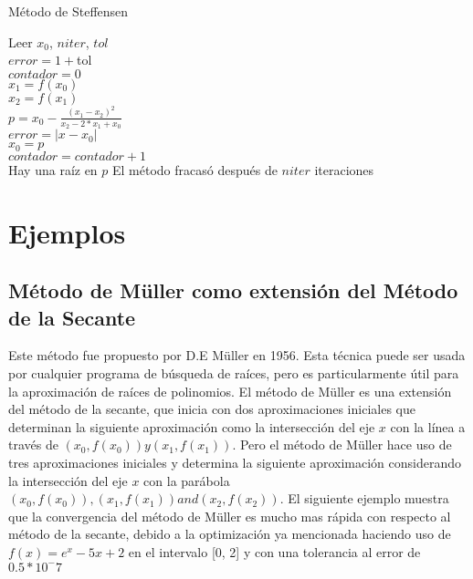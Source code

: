 \documentclass[12pt]{article}
\begin{document}
\begin{algorithm}[H]
	\caption{Método de Steffensen}
	\SetAlgoLined
	Leer $x_0$, $niter$, $tol$\\

	$error = 1 + $tol\\
	$contador = 0$\\
	{
		$x_1 = f(x_0)$\\
		$x_2 = f(x_1)$\\
		$p = x_0 - \frac{(x_1-x_2)^2}{x_2-2*x_1+x_0}$\\
		$error = |x - x_0|$\\
		$x_0 = p$\\
		$contador = contador + 1$\\
	}
	{Hay una raíz en $p$}
	{El método fracasó después de $niter$ iteraciones}
\end{algorithm}

\section{Ejemplos}
\subsection{Método de Müller como extensión del Método de la Secante}
Este método fue propuesto por D.E Müller en 1956. Esta técnica puede ser usada por cualquier programa de búsqueda de raíces, pero es particularmente útil para la aproximación de raíces de polinomios. El método de Müller es una extensión del método de la secante, que inicia con dos aproximaciones iniciales que determinan la siguiente aproximación como la intersección del eje $x$ con la línea a través de $(x_{0}, f(x_{0})) y (x_{1}, f(x_{1}))$.
Pero el método de Müller hace uso de tres aproximaciones iniciales y determina la siguiente aproximación considerando la intersección del eje $x$ con la parábola $(x_{0}, f(x_{0})), (x_{1}, f(x_{1})) and (x_{2}, f(x_{2})) $.
El siguiente ejemplo muestra que la convergencia del método de Müller es mucho mas rápida con respecto al método de la secante, debido a la optimización ya mencionada haciendo uso de 
$f(x) = e^x - 5x + 2$ en el intervalo [0, 2] y con una tolerancia al error de $0.5 * 10^-7$
\end{document}
